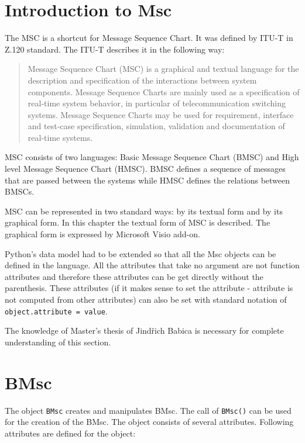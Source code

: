 \documentclass[11pt,oneside]{fithesis2}
\newcommand{\T}[1]{\texttt{#1}}
\begin{document}
\section{Introduction to Msc}
The MSC is a shortcut for Message Sequence Chart. It was defined by ITU-T\cite{itu-t} in Z.120\cite{z120} standard. The ITU-T describes it in the following way:
\begin{quote}
Message Sequence Chart (MSC) is a graphical and textual language for the description and specification of the interactions between system components. Message Sequence Charts are mainly used as a specification of real-time system behavior, in particular of telecommunication switching systems. Message Sequence Charts may be used for requirement, interface and test-case specification, simulation, validation and documentation of real-time systems.\cite{itudef}
\end{quote}

MSC consists of two languages: Basic Message Sequence Chart (BMSC) and High level Message Sequence Chart (HMSC). BMSC defines a sequence of messages that are passed between the systems while HMSC defines the relations between BMSCs.

MSC can be represented in two standard ways: by its textual form and by its graphical form. In this chapter the textual form of MSC is described. The graphical form is expressed by Microsoft Visio\cite{visio} add-on.

Python's data model had to be extended so that all the Msc objects can be defined in the language. All the attributes that take no argument are not function attributes and therefore these attributes can be get directly without the parenthesis. These attributes (if it makes sense to set the attribute - attribute is not computed from other attributes) can also be set with standard notation of \T{object.attribute = value}.

The knowledge of Master's thesis of Jindřich Babica\cite{babica} is necessary for complete understanding of this section.

\section{BMsc}
The object \T{BMsc} creates and manipulates BMsc. The call of \T{BMsc()} can be used for the creation of the BMsc. The object consists of several attributes. Following attributes are defined for the object:
\end{document}
